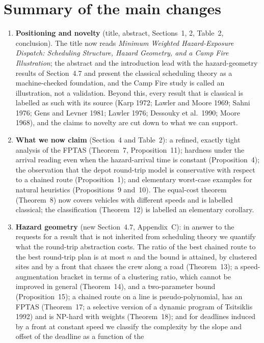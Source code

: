 \documentclass[11pt]{article}
\begin{document}
\section*{Summary of the main changes}

\begin{enumerate}[leftmargin=*,itemsep=2pt]
\item \textbf{Positioning and novelty} (title, abstract, Sections~1, 2,
Table~2, conclusion). The title now reads \emph{Minimum Weighted
Hazard-Exposure Dispatch: Scheduling Structure, Hazard Geometry, and a Camp
Fire Illustration}; the abstract and the introduction lead with the
hazard-geometry results of Section~4.7 and present the classical
scheduling theory as a machine-checked foundation, and the Camp Fire study is
called an illustration, not a validation. Beyond this, every result that is classical is labelled as such
with its source (Karp 1972; Lawler and Moore 1969; Sahni 1976; Gens and
Levner 1981; Lawler 1976; Dessouky et al.\ 1990; Moore 1968), and the
claims to novelty are cut down to what we can support.
\item \textbf{What we now claim} (Section~4 and Table~2): a refined,
exactly tight analysis of the FPTAS (Theorem~7, Proposition~11); hardness
under the arrival reading even when the hazard-arrival time is constant
(Proposition~4); the observation that the depot round-trip model is
conservative with respect to a chained route (Proposition~1); and
elementary worst-case examples for natural heuristics (Propositions~9
and~10). The equal-cost theorem (Theorem~8) now covers vehicles with
different speeds and is labelled classical; the classification
(Theorem~12) is labelled an elementary corollary.
\item \textbf{Hazard geometry} (new Section~4.7, Appendix~C): in answer to
the requests for a result that is not inherited from scheduling theory we
quantify what the round-trip abstraction costs. The ratio of the best
chained route to the best round-trip plan is at most $n$ and the bound is
attained, by clustered sites and by a front that chases the crew along a
road (Theorem~13); a speed-augmentation bracket in terms of a clustering
ratio, which cannot be improved in general (Theorem~14), and a
two-parameter bound (Proposition~15); a chained route on a line is
pseudo-polynomial, has an FPTAS (Theorem~17; a selective version of a
dynamic program of Tsitsiklis 1992) and is NP-hard with weights (Theorem~18);
and for deadlines induced by a front at constant speed we classify the
complexity by the slope and offset of the deadline as a function of the

\end{enumerate}
\end{document}
